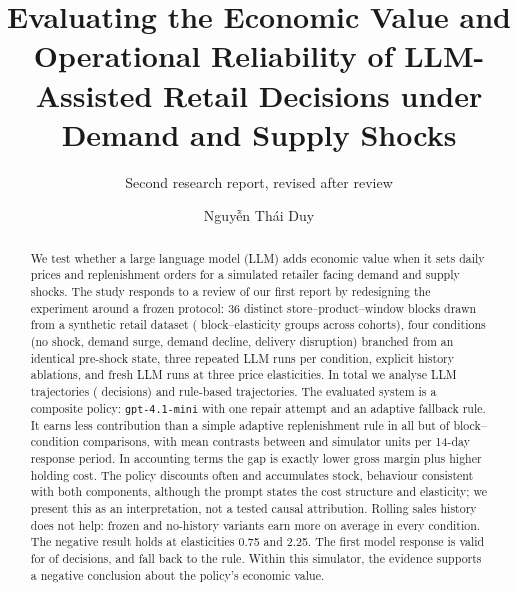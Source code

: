 \documentclass[runningheads]{llncs}
\begin{document}
\title{Evaluating the Economic Value and Operational Reliability of LLM-Assisted Retail Decisions under Demand and Supply Shocks}
\subtitle{Second research report, revised after review}
\author{\texorpdfstring{Nguy\~{\^e}n Th\'ai Duy}{Nguyen Thai Duy}}
\maketitle

\begin{abstract}
We test whether a large language model (LLM) adds economic value when it sets daily prices and replenishment orders for a simulated retailer facing demand and supply shocks. The study responds to a review of our first report by redesigning the experiment around a frozen protocol: 36 distinct store--product--window blocks drawn from a synthetic retail dataset ( block--elasticity groups across cohorts), four conditions (no shock, demand surge, demand decline, delivery disruption) branched from an identical pre-shock state, three repeated LLM runs per condition, explicit history ablations, and fresh LLM runs at three price elasticities. In total we analyse  LLM trajectories ( decisions) and  rule-based trajectories. The evaluated system is a composite policy: \texttt{gpt-4.1-mini} with one repair attempt and an adaptive fallback rule. It earns less contribution than a simple adaptive replenishment rule in all but  of  block--condition comparisons, with mean contrasts between  and  simulator units per 14-day response period. In accounting terms the gap is exactly lower gross margin plus higher holding cost. The policy discounts often and accumulates stock, behaviour consistent with both components, although the prompt states the cost structure and elasticity; we present this as an interpretation, not a tested causal attribution. Rolling sales history does not help: frozen and no-history variants earn more on average in every condition. The negative result holds at elasticities 0.75 and 2.25. The first model response is valid for  of decisions, and  fall back to the rule. Within this simulator, the evidence supports a negative conclusion about the policy's economic value.

\end{abstract}
\end{document}
